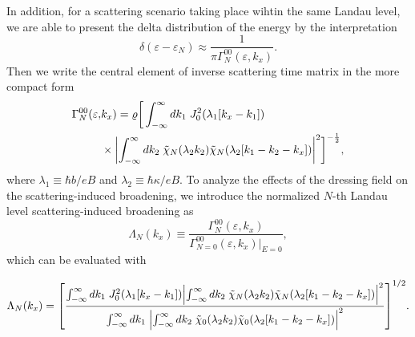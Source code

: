 In addition, for a scattering scenario taking place wihtin the same Landau level, we are able to present the delta distribution of the energy by the  interpretation \cite{dini16}
\begin{equation} \label{eq_16}
 \delta(\varepsilon - \varepsilon_{N}) \approx
 \frac{1}{\pi \Gamma^{00}_{N}(\varepsilon,k_x)}.
\end{equation}
Then we write the central element of inverse scattering time matrix in the more compact form
\begin{equation} \label{eq_17}
  \begin{aligned}
    \Gamma^{00}_{N}(\varepsilon,& k_x) =
    \varrho
    \bigg[
    \int_{-\infty}^{\infty} d {k}_1 \;
    J_0^2\qty(\lambda_1[{k}_x - {k}_1]) \\
    & \times
    \qty|
    \int_{-\infty}^{\infty} d{k}_2 \;
    \tilde{\chi}_{N}\qty(\lambda_2 k_2)
    \tilde{\chi}_{N}\qty(\lambda_2 \qty[{k}_1 - {k}_2 - {k}_x])|^2
    \bigg]^{-\frac{1}{2}},
  \end{aligned}
\end{equation}
where $ \lambda_1 \equiv \hbar b/eB$ and  $\lambda_2 \equiv \hbar \kappa/eB$.
To analyze the effects of the dressing field on the scattering-induced broadening, we introduce the normalized $N$-th Landau level scattering-induced broadening as
\begin{equation} \label{eq_18}
    \Lambda_N(k_x) \equiv
    \frac{\Gamma^{00}_{N}(\varepsilon,k_x)}{\Gamma^{00}_{N=0}(\varepsilon,k_x)\big|_{E=0}},
\end{equation}
which can be evaluated with
\begin{widetext}
\begin{equation} \label{eq_19}
    \Lambda_N (k_x) =
    \qty[
    \frac
    {\int_{-\infty}^{\infty} d {k}_1 \;
    J_0^2\qty(\lambda_1[{k}_x - {k}_1])
    \qty|
    \int_{-\infty}^{\infty} d{k}_2 \;
    \tilde{\chi}_{N}\qty(\lambda_2 k_2)
    \tilde{\chi}_{N}\qty(\lambda_2 \qty[{k}_1 - {k}_2 - {k}_x])|^2}
    {\int_{-\infty}^{\infty} d {k}_1 \;
    \qty|
    \int_{-\infty}^{\infty} d{k}_2 \;
    \tilde{\chi}_{0}\qty(\lambda_2 k_2)
    \tilde{\chi}_{0}\qty(\lambda_2 \qty[{k}_1 - {k}_2 - {k}_x])|^2}
    ]^{1/2}.
\end{equation}
\end{widetext}

